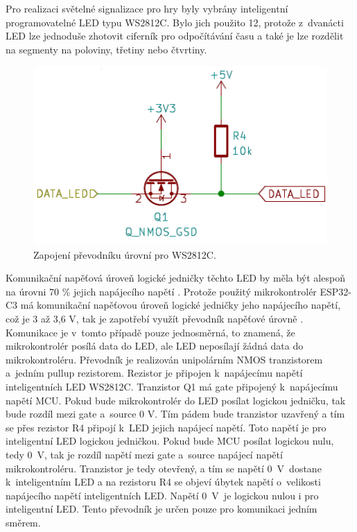 Pro realizaci světelné signalizace pro hry byly vybrány inteligentní programovatelné LED typu WS2812C. Bylo jich použito 12, protože 
z~dvanácti LED lze jednoduše zhotovit ciferník pro odpočítávání času a také je lze rozdělit na segmenty na poloviny, třetiny nebo čtvrtiny. 

\begin{figure}[!h]
  \begin{center}
    \includegraphics[scale=0.6]{obrazky/prevodnik_urovni_pro_WS2812C.png}
  \end{center}
  \caption[Zapojení převodníku úrovní pro WS2812C]{Zapojení převodníku úrovní pro WS2812C.}
\end{figure} 

Komunikační napěťová úroveň logické jedničky těchto LED by měla být alespoň na úrovni 70 \% jejich napájecího napětí \cite{WS2812C_dtsh}. 
Protože použitý mikrokontrolér ESP32-C3 má komunikační napěťovou úroveň logické jedničky jeho napájecího napětí, což je 3 až 3,6 V, 
tak je zapotřebí využít převodník napěťové úrovně \cite{ESP_C3_dtsh}. Komunikace je v~tomto případě pouze jednosměrná, 
to znamená, že mikrokontrolér posílá data do LED, ale LED neposílají žádná data do mikrokontroléru. Převodník je realizován unipolárním 
NMOS tranzistorem 
a~jedním pullup rezistorem. Rezistor je připojen k~napájecímu napětí inteligentních LED WS2812C. 
Tranzistor Q1 má gate připojený k~napájecímu napětí MCU. Pokud bude mikrokontrolér do LED posílat logickou jedničku, tak bude rozdíl
mezi gate a~source 0 V. Tím pádem bude tranzistor uzavřený a tím se přes rezistor R4 připojí k~LED jejich napájecí napětí. Toto napětí 
je pro inteligentní LED logickou jedničkou. Pokud bude MCU posílat logickou nulu, tedy 0~V, tak je rozdíl napětí mezi gate a~source 
napájecí napětí mikrokontroléru. Tranzistor je tedy otevřený, a tím se napětí 0~V~dostane k~inteligentním LED a na rezistoru R4 se objeví
úbytek napětí o~velikosti napájecího napětí inteligentních LED. Napětí 0~V~je logickou nulou i pro inteligentní LED. Tento převodník
je určen pouze pro komunikaci jedním směrem. 

